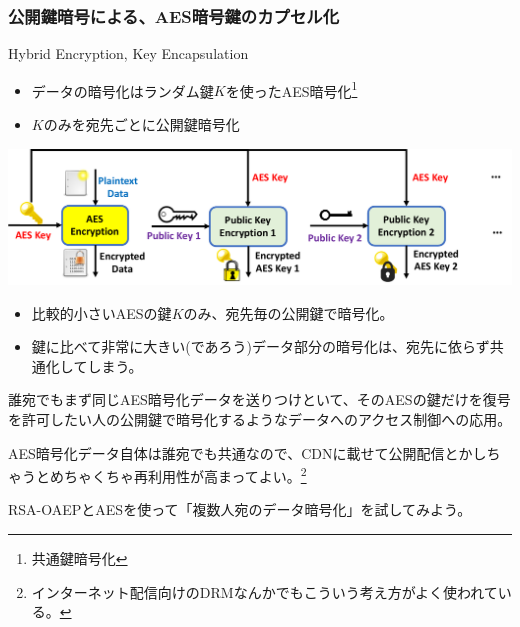 \documentclass[12pt,dvipdfmx]{beamer}
\begin{document}
\begin{frame}
\frametitle{公開鍵暗号による、AES暗号鍵のカプセル化}
\begin{block}{\small Hybrid Encryption, Key Encapsulation}
\begin{itemize}
 \item データの暗号化はランダム鍵$K$を使ったAES暗号化\footnote[frame]{\scriptsize 共通鍵暗号化}
 \item $K$のみを宛先ごとに公開鍵暗号化
\end{itemize}
\end{block}

\vspace{2ex}

\begin{center}
\includegraphics[width=\linewidth]{Figs/hybrid-encryption-flow01.pdf}
\end{center}
\end{frame}

\begin{frame}
\begin{itemize}
 \item 比較的小さいAESの鍵$K$のみ、宛先毎の公開鍵で暗号化。
 \item 鍵に比べて非常に大きい(であろう)\alert{データ部分の暗号化は、宛先に依らず共通化}してしまう。
\end{itemize}

\begin{block}{}
誰宛でもまず同じAES暗号化データを送りつけといて、そのAESの鍵だけを復号を許可したい人の公開鍵で暗号化するようなデータへのアクセス制御への応用。
\end{block}

\begin{block}{}
AES暗号化データ自体は誰宛でも共通なので、CDNに載せて公開配信とかしちゃうとめちゃくちゃ再利用性が高まってよい。\footnote[frame]{\scriptsize インターネット配信向けのDRMなんかでもこういう考え方がよく使われている。}
\end{block}

\end{frame}

\begin{frame}
RSA-OAEPとAESを使って「複数人宛のデータ暗号化」を試してみよう。 
\end{frame}
\end{document}
